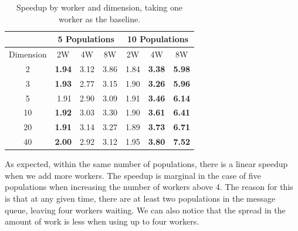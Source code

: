 \documentclass[review]{elsarticle}
\begin{document}
\begin{table}[h!tbp]
  \caption{Speedup by worker and dimension, taking one worker as the baseline.}
  \label{tab:speedup-table}
  \vspace{0.25cm}
  \centering

  \begin{tabular}{c|r|r|r|r|r|r|}
  \cline{2-7}
  \multicolumn{1}{l|}{}           & \multicolumn{3}{c|}{5 Populations}                                          & \multicolumn{3}{c|}{10 Populations}                                         \\ \hline
  \multicolumn{1}{|l|}{Dimension} & \multicolumn{1}{c|}{2W} & \multicolumn{1}{c|}{4W} & \multicolumn{1}{c|}{8W} & \multicolumn{1}{c|}{2W} & \multicolumn{1}{c|}{4W} & \multicolumn{1}{c|}{8W} \\ \hline
  \multicolumn{1}{|c|}{2}         & \textbf{1.94}           & 3.12                    & 3.86                    & 1.84                    & \textbf{3.38}                    & \textbf{5.98}                    \\ \hline
  \multicolumn{1}{|c|}{3}         & \textbf{1.93}           & 2.77                    & 3.15                    & 1.90                    & \textbf{3.26}                   & \textbf{5.96}                    \\ \hline
  \multicolumn{1}{|c|}{5}         & 1.91                    & 2.90                    & 3.09                    & 1.91                    & \textbf{3.46}                    & \textbf{6.14}                    \\ \hline
  \multicolumn{1}{|c|}{10}        & \textbf{1.92}           & 3.03                    & 3.30                    & 1.90                    & \textbf{3.61}                   & \textbf{6.41}                    \\ \hline
  \multicolumn{1}{|c|}{20}        & \textbf{1.91}           & 3.14                    & 3.27                    & 1.89                    & \textbf{3.73}                   & \textbf{6.71}                    \\ \hline
  \multicolumn{1}{|c|}{40}        & \textbf{2.00}           & 2.92                    & 3.12                    & 1.95                    & \textbf{3.80}                     & \textbf{7.52}                    \\ \hline
  \end{tabular}
\end{table}
%
As expected, within the same number of populations, there is a linear speedup
when we add more workers. The speedup is marginal in the case of five
populations when increasing the number of workers above 4. The reason for this
is that at any given time, there are at least two populations in the message
queue, leaving four workers waiting. We can also notice that the spread in the
amount of work is less when using up to four workers.
\end{document}
